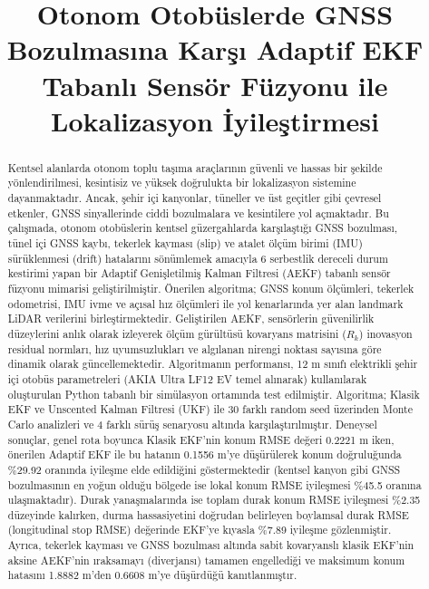 ﻿\documentclass[conference]{IEEEtran}
\title{Otonom Otobüslerde GNSS Bozulmasına Karşı Adaptif EKF Tabanlı Sensör Füzyonu ile Lokalizasyon İyileştirmesi}
\author{
\IEEEauthorblockN{Proje Raporu}
\IEEEauthorblockA{Mobil Robotlar ve Uygulamaları Dersi -- Final Ödevi \\
GitHub Deposu: \url{https://github.com/TarikSercanESENKUL/mobilrobotekf}}
}
\begin{document}
\maketitle

\begin{abstract}
Kentsel alanlarda otonom toplu taşıma araçlarının güvenli ve hassas bir şekilde yönlendirilmesi, kesintisiz ve yüksek doğrulukta bir lokalizasyon sistemine dayanmaktadır. Ancak, şehir içi kanyonlar, tüneller ve üst geçitler gibi çevresel etkenler, GNSS sinyallerinde ciddi bozulmalara ve kesintilere yol açmaktadır. Bu çalışmada, otonom otobüslerin kentsel güzergahlarda karşılaştığı GNSS bozulması, tünel içi GNSS kaybı, tekerlek kayması (slip) ve atalet ölçüm birimi (IMU) sürüklenmesi (drift) hatalarını sönümlemek amacıyla 6 serbestlik dereceli durum kestirimi yapan bir Adaptif Genişletilmiş Kalman Filtresi (AEKF) tabanlı sensör füzyonu mimarisi geliştirilmiştir. Önerilen algoritma; GNSS konum ölçümleri, tekerlek odometrisi, IMU ivme ve açısal hız ölçümleri ile yol kenarlarında yer alan landmark LiDAR verilerini birleştirmektedir. Geliştirilen AEKF, sensörlerin güvenilirlik düzeylerini anlık olarak izleyerek ölçüm gürültüsü kovaryans matrisini ($R_k$) inovasyon residual normları, hız uyumsuzlukları ve algılanan nirengi noktası sayısına göre dinamik olarak güncellemektedir. Algoritmanın performansı, 12 m sınıfı elektrikli şehir içi otobüs parametreleri (AKIA Ultra LF12 EV temel alınarak) kullanılarak oluşturulan Python tabanlı bir simülasyon ortamında test edilmiştir. Algoritma; Klasik EKF ve Unscented Kalman Filtresi (UKF) ile 30 farklı random seed üzerinden Monte Carlo analizleri ve 4 farklı sürüş senaryosu altında karşılaştırılmıştır. Deneysel sonuçlar, genel rota boyunca Klasik EKF'nin konum RMSE değeri 0.2221 m iken, önerilen Adaptif EKF ile bu hatanın 0.1556 m'ye düşürülerek konum doğruluğunda \%29.92 oranında iyileşme elde edildiğini göstermektedir (kentsel kanyon gibi GNSS bozulmasının en yoğun olduğu bölgede ise lokal konum RMSE iyileşmesi \%45.5 oranına ulaşmaktadır). Durak yanaşmalarında ise toplam durak konum RMSE iyileşmesi \%2.35 düzeyinde kalırken, durma hassasiyetini doğrudan belirleyen boylamsal durak RMSE (longitudinal stop RMSE) değerinde EKF'ye kıyasla \%7.89 iyileşme gözlenmiştir. Ayrıca, tekerlek kayması ve GNSS bozulması altında sabit kovaryanslı klasik EKF'nin aksine AEKF'nin ıraksamayı (diverjansı) tamamen engellediği ve maksimum konum hatasını 1.8882 m'den 0.6608 m'ye düşürdüğü kanıtlanmıştır.
\end{abstract}
\end{document}
